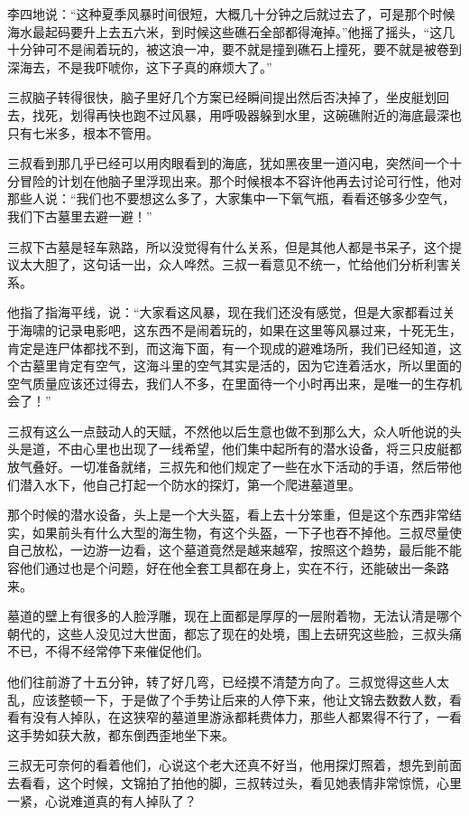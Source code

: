 李四地说：“这种夏季风暴时间很短，大概几十分钟之后就过去了，可是那个时候海水最起码要升上去五六米，到时候这些礁石全部都得淹掉。”他摇了摇头，“这几十分钟可不是闹着玩的，被这浪一冲，要不就是撞到礁石上撞死，要不就是被卷到深海去，不是我吓唬你，这下子真的麻烦大了。”

三叔脑子转得很快，脑子里好几个方案已经瞬间提出然后否决掉了，坐皮艇划回去，找死，划得再快也跑不过风暴，用呼吸器躲到水里，这碗礁附近的海底最深也只有七米多，根本不管用。

三叔看到那几乎已经可以用肉眼看到的海底，犹如黑夜里一道闪电，突然间一个十分冒险的计划在他脑子里浮现出来。那个时候根本不容许他再去讨论可行性，他对那些人说：“我们也不要想这么多了，大家集中一下氧气瓶，看看还够多少空气，我们下古墓里去避一避！”

三叔下古墓是轻车熟路，所以没觉得有什么关系，但是其他人都是书呆子，这个提议太大胆了，这句话一出，众人哗然。三叔一看意见不统一，忙给他们分析利害关系。

他指了指海平线，说：“大家看这风暴，现在我们还没有感觉，但是大家都看过关于海啸的记录电影吧，这东西不是闹着玩的，如果在这里等风暴过来，十死无生，肯定是连尸体都找不到，而这海下面，有一个现成的避难场所，我们已经知道，这个古墓里肯定有空气，这海斗里的空气其实是活的，因为它连着活水，所以里面的空气质量应该还过得去，我们人不多，在里面待一个小时再出来，是唯一的生存机会了！”

三叔有这么一点鼓动人的天赋，不然他以后生意也做不到那么大，众人听他说的头头是道，不由心里也出现了一线希望，他们集中起所有的潜水设备，将三只皮艇都放气叠好。一切准备就绪，三叔先和他们规定了一些在水下活动的手语，然后带他们潜入水下，他自己打起一个防水的探灯，第一个爬进墓道里。

那个时候的潜水设备，头上是一个大头盔，看上去十分笨重，但是这个东西非常结实，如果前头有什么大型的海生物，有这个头盔，一下子也吞不掉他。三叔尽量使自己放松，一边游一边看，这个墓道竟然是越来越窄，按照这个趋势，最后能不能容他们通过也是个问题，好在他全套工具都在身上，实在不行，还能破出一条路来。

墓道的壁上有很多的人脸浮雕，现在上面都是厚厚的一层附着物，无法认清是哪个朝代的，这些人没见过大世面，都忘了现在的处境，围上去研究这些脸，三叔头痛不已，不得不经常停下来催促他们。

他们往前游了十五分钟，转了好几弯，已经摸不清楚方向了。三叔觉得这些人太乱，应该整顿一下，于是做了个手势让后来的人停下来，他让文锦去数数人数，看看有没有人掉队，在这狭窄的墓道里游泳都耗费体力，那些人都累得不行了，一看这手势如获大赦，都东倒西歪地坐下来。

三叔无可奈何的看着他们，心说这个老大还真不好当，他用探灯照着，想先到前面去看看，这个时候，文锦拍了拍他的脚，三叔转过头，看见她表情非常惊慌，心里一紧，心说难道真的有人掉队了？

